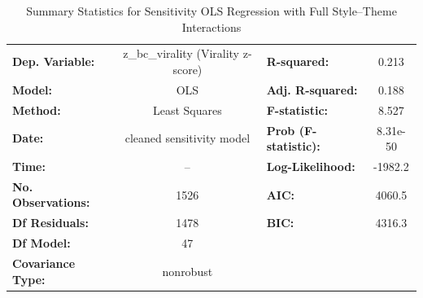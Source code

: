 \documentclass[12pt,a4paper]{report}
\begin{document}
\begin{table}
    \centering
    \captionsetup{justification=centering}
    \caption{Summary Statistics for Sensitivity OLS Regression with Full Style--Theme Interactions}
    \label{tab:ols_virality_summary}
    \scriptsize %
    \setlength{\tabcolsep}{3pt} %

    \begin{tabular}{lclc}
        \toprule
        \textbf{Dep. Variable:}     & z\_bc\_virality (Virality z-score) & \textbf{R-squared:}         & 0.213   \\
        \textbf{Model:}             & OLS                                & \textbf{Adj. R-squared:}    & 0.188   \\
        \textbf{Method:}            & Least Squares                      & \textbf{F-statistic:}       & 8.527   \\
        \textbf{Date:}              & cleaned sensitivity model          & \textbf{Prob (F-statistic):} & 8.31e-50 \\
        \textbf{Time:}              & --                                 & \textbf{Log-Likelihood:}    & -1982.2 \\
        \textbf{No. Observations:}  & 1526                               & \textbf{AIC:}               & 4060.5  \\
        \textbf{Df Residuals:}      & 1478                               & \textbf{BIC:}               & 4316.3  \\
        \textbf{Df Model:}          & 47                                 & \textbf{}                   &         \\
        \textbf{Covariance Type:}   & nonrobust                          & \textbf{}                   &         \\
        \bottomrule
    \end{tabular}
\end{table}
\end{document}
